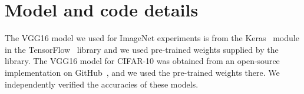 \documentclass{article}
\newcommand{\pl}[1]{}
\begin{document}
















\appendix

\newpage 
\section{Model and code details}

The VGG16 model we used for ImageNet experiments is from the Keras~\cite{chollet2015} module in the TensorFlow~\cite{tensorflow2015-whitepaper} library and we used pre-trained weights supplied by the library. The VGG16 model for CIFAR-10 was obtained from an open-source implementation on GitHub~\cite{geifman2017}, and we used the pre-trained weights there. We independently verified the accuracies of these models.












\end{document}
